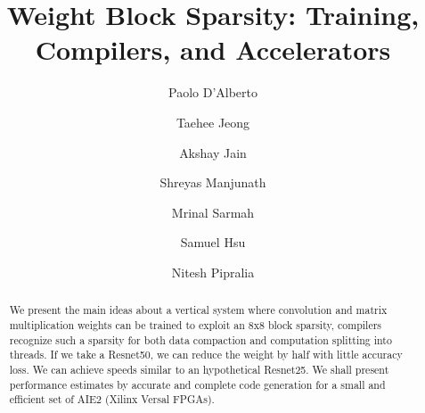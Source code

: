 \documentclass[sigconf]{acmart}
\begin{document}
\title{Weight Block Sparsity: Training, Compilers, and Accelerators}

\author{Paolo D'\!Alberto}
\author{Taehee Jeong}
\author{Akshay Jain}
\author{Shreyas Manjunath}
\author{Mrinal Sarmah}
\author{Samuel Hsu}
\author{Nitesh Pipralia}

\renewcommand{\shortauthors}{ D'\!Alberto et al.}

\begin{abstract}
We present the main ideas about a vertical system where convolution
and matrix multiplication weights can be trained to exploit an 8x8
block sparsity, compilers recognize such a sparsity for both data
compaction and computation splitting into threads. If we take a
Resnet50, we can reduce the weight by half with little accuracy
loss. We can achieve speeds similar to an hypothetical Resnet25. We
shall present performance estimates by accurate and complete code
generation for a small and efficient set of AIE2 (Xilinx Versal
FPGAs).
\end{abstract}




\maketitle
\end{document}

